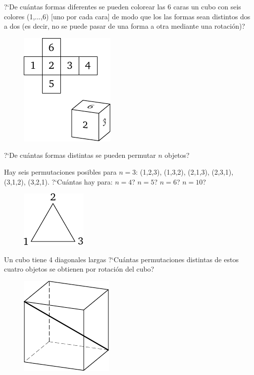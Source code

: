 \documentclass[12pt, spanish]{article}  %
\begin{document}
\newpage
{} ?`De cu\'antas formas diferentes se pueden colorear las 6 caras un cubo con seis colores (1,...,6) [uno por cada cara]
de modo que los las formas sean distintos dos a dos (es decir, no se puede pasar de una forma a otra mediante una rotaci\'on)? 
\begin{figure}[h]
\centering
\includegraphics{taskbook-17}
\end{figure}


 ?`De cu\'antas formas distintas se pueden permutar $n$ objetos?

Hay seis permutaciones posibles para $n=3$: (1,2,3), (1,3,2), (2,1,3), (2,3,1), (3,1,2), (3,2,1). ?`Cu\'antas hay para: $n=4$? $n=5$? $n=6$? $n=10$?
\begin{figure}[h]
\centering
\includegraphics{taskbook-18}
\end{figure}

 Un cubo tiene 4 diagonales largas ?`Cu\'antas permutaciones distintas de estos cuatro objetos se obtienen por rotaci\'on del cubo?
\begin{figure}[h]
\centering
\includegraphics{taskbook-19}
\end{figure}
\end{document}
